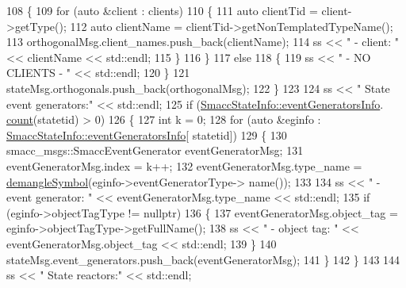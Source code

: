 \begin{DoxyCode}
108                 \{
109                     \textcolor{keywordflow}{for} (\textcolor{keyword}{auto} &client : clients)
110                     \{
111                         \textcolor{keyword}{auto} clientTid = client->getType();
112                         \textcolor{keyword}{auto} clientName = clientTid->getNonTemplatedTypeName();
113                         orthogonalMsg.client\_names.push\_back(clientName);
114                         ss << \textcolor{stringliteral}{"          - client: "} << clientName << std::endl;
115                     \}
116                 \}
117                 \textcolor{keywordflow}{else}
118                 \{
119                     ss << \textcolor{stringliteral}{"          - NO CLIENTS - "} << std::endl;
120                 \}
121                 stateMsg.orthogonals.push\_back(orthogonalMsg);
122             \}
123 
124             ss << \textcolor{stringliteral}{" State event generators:"} << std::endl;
125             \textcolor{keywordflow}{if} (\hyperlink{classsmacc_1_1introspection_1_1SmaccStateInfo_ae38b8c98fb7808cc67b67e1f97ddbf74}{SmaccStateInfo::eventGeneratorsInfo}.
      \hyperlink{namespacesm__fetch__two__table__whiskey__pour_acbce06cd0c9048e8be6a258e2c406986}{count}(statetid) > 0)
126             \{
127                 \textcolor{keywordtype}{int} k = 0;
128                 \textcolor{keywordflow}{for} (\textcolor{keyword}{auto} &eginfo : \hyperlink{classsmacc_1_1introspection_1_1SmaccStateInfo_ae38b8c98fb7808cc67b67e1f97ddbf74}{SmaccStateInfo::eventGeneratorsInfo}[
      statetid])
129                 \{
130                     smacc\_msgs::SmaccEventGenerator eventGeneratorMsg;
131                     eventGeneratorMsg.index = k++;
132                     eventGeneratorMsg.type\_name = \hyperlink{namespacesmacc_1_1introspection_a2f495108db3e57604d8d3ff5ef030302}{demangleSymbol}(eginfo->eventGeneratorType->
      name());
133 
134                     ss << \textcolor{stringliteral}{" - event generator: "} << eventGeneratorMsg.type\_name << std::endl;
135                     \textcolor{keywordflow}{if} (eginfo->objectTagType != \textcolor{keyword}{nullptr})
136                     \{
137                         eventGeneratorMsg.object\_tag = eginfo->objectTagType->getFullName();
138                         ss << \textcolor{stringliteral}{"        - object tag: "} << eventGeneratorMsg.object\_tag << std::endl;
139                     \}
140                     stateMsg.event\_generators.push\_back(eventGeneratorMsg);
141                 \}                
142             \}
143 
144             ss << \textcolor{stringliteral}{" State reactors:"} << std::endl;

\end{DoxyCode}
